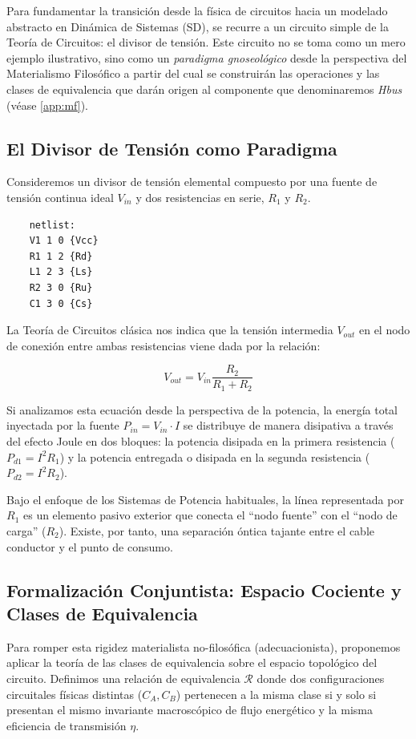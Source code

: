 \documentclass[11pt, a4paper]{article}
\theoremstyle{definition}
\theoremstyle{plain}
\theoremstyle{plain}
\theoremstyle{remark}
\theoremstyle{remark}
\theoremstyle{remark}
\begin{document}
Para fundamentar la transición desde la física de circuitos hacia un modelado abstracto en Dinámica de Sistemas (SD), se recurre a un circuito simple de la Teoría de Circuitos: el divisor de tensión. Este circuito no se toma como un mero ejemplo ilustrativo, sino como un \textit{paradigma gnoseológico} desde la perspectiva del Materialismo Filosófico a partir del cual se construirán las operaciones y las clases de equivalencia que darán origen al componente que denominaremos \textit{Hbus} (véase \ref{app:mf}).




{\color{red} \subsection{El Divisor de Tensión como Paradigma}}

Consideremos un divisor de tensión elemental compuesto por una fuente de tensión continua ideal $V_{in}$ y dos resistencias en serie, $R_1$ y $R_2$. 
\begin{verbatim}
	netlist:
	V1 1 0 {Vcc}
	R1 1 2 {Rd}
	L1 2 3 {Ls}
	R2 3 0 {Ru}
	C1 3 0 {Cs}
\end{verbatim}

La Teoría de Circuitos clásica nos indica que la tensión intermedia $V_{out}$ en el nodo de conexión entre ambas resistencias viene dada por la relación:

\begin{equation}
	V_{out} = V_{in} \frac{R_2}{R_1 + R_2}
\end{equation}

Si analizamos esta ecuación desde la perspectiva de la potencia, la energía total inyectada por la fuente $P_{in} = V_{in} \cdot I$ se distribuye de manera disipativa a través del efecto Joule en dos bloques: la potencia disipada en la primera resistencia ($P_{d1} = I^2 R_1$) y la potencia entregada o disipada en la segunda resistencia ($P_{d2} = I^2 R_2$). 

Bajo el enfoque de los Sistemas de Potencia habituales, la línea representada por $R_1$ es un elemento pasivo exterior que conecta el ``nodo fuente'' con el ``nodo de carga'' ($R_2$). Existe, por tanto, una separación óntica tajante entre el cable conductor y el punto de consumo.

\subsection{Formalización Conjuntista: Espacio Cociente y Clases de Equivalencia}
Para romper esta rigidez materialista no-filosófica (adecuacionista), proponemos aplicar la teoría de las clases de equivalencia sobre el espacio topológico del circuito. Definimos una relación de equivalencia $\mathcal{R}$ donde dos configuraciones circuitales físicas distintas ($C_A, C_B$) pertenecen a la misma clase si y solo si presentan el mismo invariante macroscópico de flujo energético y la misma eficiencia de transmisión $\eta$.
\end{document}
